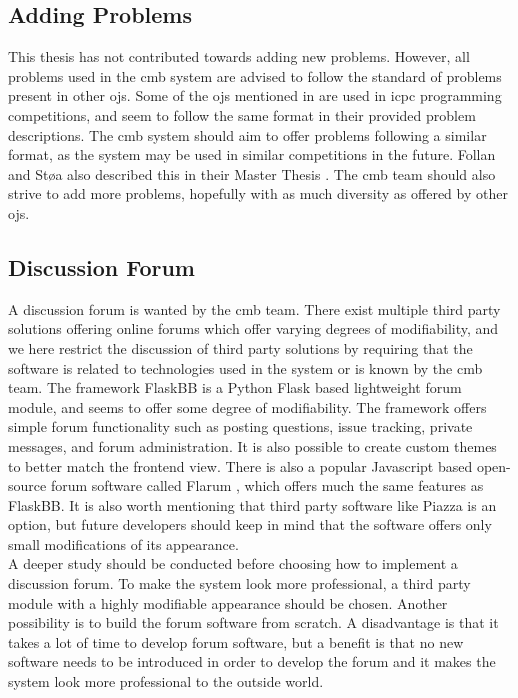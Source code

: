\subsection{Adding Problems}
\label{sub-sec:prop-problems}
This thesis has not contributed towards adding new problems. However, all problems used in the \gls{cmb} system are advised to follow the standard of problems present in other \glspl{oj}. Some of the \glspl{oj} mentioned in  are used in \gls{icpc} programming competitions, and seem to follow the same format in their provided problem descriptions. The \gls{cmb} system should aim to offer problems following a similar format, as the system may be used in similar competitions in the future. Follan and Støa also described this in their Master Thesis \cite{mt:T&S}. The \gls{cmb} team should also strive to add more problems, hopefully with as much diversity as offered by other \glspl{oj}.

\subsection{Discussion Forum}
\label{sub-sec:prop-forum}
A discussion forum is wanted by the \gls{cmb} team. There exist multiple third party solutions offering online forums which offer varying degrees of modifiability, and we here restrict the discussion of third party solutions by requiring that the software is related to technologies used in the system or is known by the \gls{cmb} team. The framework FlaskBB \cite{FLASKBB} is a Python Flask based lightweight forum module, and seems to offer some degree of modifiability. The framework offers simple forum functionality such as posting questions, issue tracking, private messages, and forum administration. It is also possible to create custom themes to better match the frontend view. There is also a popular Javascript based open-source forum software called Flarum \cite{FLARUM}, which offers much the same features as FlaskBB. It is also worth mentioning that third party software like Piazza is an option, but future developers should keep in mind that the software offers only small modifications of its appearance. \\

A deeper study should be conducted before choosing how to implement a discussion forum. To make the system look more professional, a third party module with a highly modifiable appearance should be chosen. Another possibility is to build the forum software from scratch. A disadvantage is that it takes a lot of time to develop forum software, but a benefit is that no new software needs to be introduced in order to develop the forum and it makes the system look more professional to the outside world.
